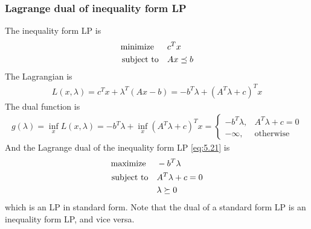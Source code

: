 \subsubsection{Lagrange dual of inequality form LP}
The inequality form LP is
\begin{align}
  \text{minimize\;\;}\quad& c^Tx\nonumber\\
  \text{subject to}  \quad& Ax\preceq b\label{eq:5.21}
\end{align}
The Lagrangian is
\begin{align*}
  L(x,\lambda)=c^Tx+\lambda^T(Ax-b)=-b^T\lambda+(A^T\lambda+c)^Tx
\end{align*}
The dual function is
\begin{align*}
  g(\lambda)=\inf_xL(x,\lambda)=-b^T\lambda+\inf_x(A^T\lambda+c)^Tx=
  \begin{cases}
    -b^T\lambda, &A^T\lambda+c=0\\
    -\infty    , &\text{otherwise}
  \end{cases}
\end{align*}
And the Lagrange dual of the inequality form LP \eqref{eq:5.21} is
\begin{align}
  \text{maximize\;}\quad& -b^T\lambda\nonumber\\
  \text{subject to}\quad& A^T\lambda+c=0\label{eq:5.22}\\
                        & \lambda\succeq 0\nonumber
\end{align}
which is an LP in standard form.
Note that the dual of a standard form LP is an inequality form LP, and vice versa.

